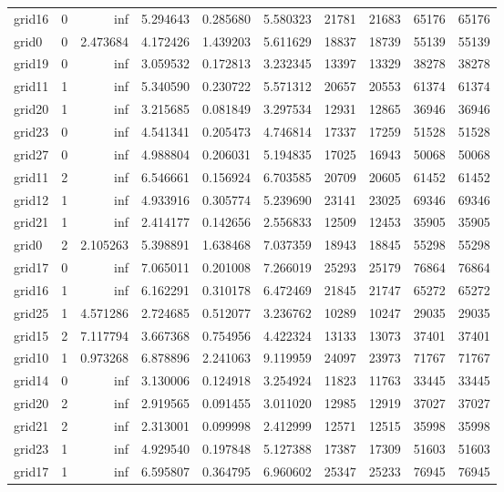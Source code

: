 \begin{longtable}{|l|r|r|r|r|r|r|r|r|r|}
grid16 & 0 & inf & 5.294643 & 0.285680 & 5.580323 & 21781 & 21683 & 65176 & 65176 \\
grid0 & 0 & 2.473684 & 4.172426 & 1.439203 & 5.611629 & 18837 & 18739 & 55139 & 55139 \\
grid19 & 0 & inf & 3.059532 & 0.172813 & 3.232345 & 13397 & 13329 & 38278 & 38278 \\
grid11 & 1 & inf & 5.340590 & 0.230722 & 5.571312 & 20657 & 20553 & 61374 & 61374 \\
grid20 & 1 & inf & 3.215685 & 0.081849 & 3.297534 & 12931 & 12865 & 36946 & 36946 \\
grid23 & 0 & inf & 4.541341 & 0.205473 & 4.746814 & 17337 & 17259 & 51528 & 51528 \\
grid27 & 0 & inf & 4.988804 & 0.206031 & 5.194835 & 17025 & 16943 & 50068 & 50068 \\
grid11 & 2 & inf & 6.546661 & 0.156924 & 6.703585 & 20709 & 20605 & 61452 & 61452 \\
grid12 & 1 & inf & 4.933916 & 0.305774 & 5.239690 & 23141 & 23025 & 69346 & 69346 \\
grid21 & 1 & inf & 2.414177 & 0.142656 & 2.556833 & 12509 & 12453 & 35905 & 35905 \\
grid0 & 2 & 2.105263 & 5.398891 & 1.638468 & 7.037359 & 18943 & 18845 & 55298 & 55298 \\
grid17 & 0 & inf & 7.065011 & 0.201008 & 7.266019 & 25293 & 25179 & 76864 & 76864 \\
grid16 & 1 & inf & 6.162291 & 0.310178 & 6.472469 & 21845 & 21747 & 65272 & 65272 \\
grid25 & 1 & 4.571286 & 2.724685 & 0.512077 & 3.236762 & 10289 & 10247 & 29035 & 29035 \\
grid15 & 2 & 7.117794 & 3.667368 & 0.754956 & 4.422324 & 13133 & 13073 & 37401 & 37401 \\
grid10 & 1 & 0.973268 & 6.878896 & 2.241063 & 9.119959 & 24097 & 23973 & 71767 & 71767 \\
grid14 & 0 & inf & 3.130006 & 0.124918 & 3.254924 & 11823 & 11763 & 33445 & 33445 \\
grid20 & 2 & inf & 2.919565 & 0.091455 & 3.011020 & 12985 & 12919 & 37027 & 37027 \\
grid21 & 2 & inf & 2.313001 & 0.099998 & 2.412999 & 12571 & 12515 & 35998 & 35998 \\
grid23 & 1 & inf & 4.929540 & 0.197848 & 5.127388 & 17387 & 17309 & 51603 & 51603 \\
grid17 & 1 & inf & 6.595807 & 0.364795 & 6.960602 & 25347 & 25233 & 76945 & 76945 \\

\end{longtable}
